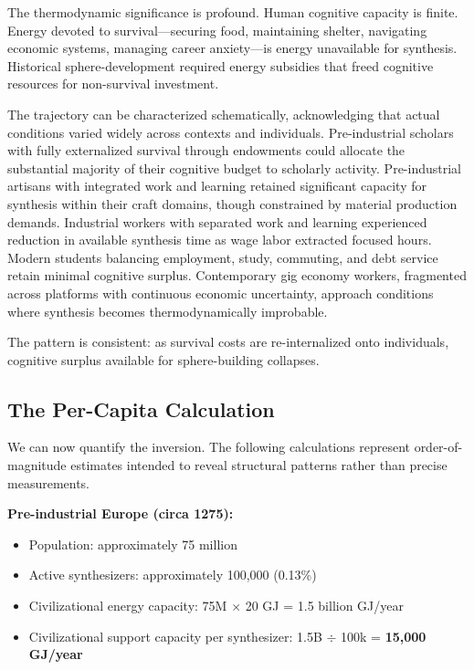 The thermodynamic significance is profound. Human cognitive capacity is finite. Energy devoted to survival---securing food, maintaining shelter, navigating economic systems, managing career anxiety---is energy unavailable for synthesis. Historical sphere-development required energy subsidies that freed cognitive resources for non-survival investment.

The trajectory can be characterized schematically, acknowledging that actual conditions varied widely across contexts and individuals. Pre-industrial scholars with fully externalized survival through endowments could allocate the substantial majority of their cognitive budget to scholarly activity. Pre-industrial artisans with integrated work and learning retained significant capacity for synthesis within their craft domains, though constrained by material production demands. Industrial workers with separated work and learning experienced reduction in available synthesis time as wage labor extracted focused hours. Modern students balancing employment, study, commuting, and debt service retain minimal cognitive surplus. Contemporary gig economy workers, fragmented across platforms with continuous economic uncertainty, approach conditions where synthesis becomes thermodynamically improbable.

The pattern is consistent: as survival costs are re-internalized onto individuals, cognitive surplus available for sphere-building collapses.

\subsection{The Per-Capita Calculation}

We can now quantify the inversion. The following calculations represent order-of-magnitude estimates intended to reveal structural patterns rather than precise measurements.

\textbf{Pre-industrial Europe (circa 1275):}

\begin{itemize}
    \item Population: approximately 75 million
    \item Active synthesizers: approximately 100,000 (0.13\%)
    \item Civilizational energy capacity: 75M $\times$ 20 GJ = 1.5 billion GJ/year
    \item Civilizational support capacity per synthesizer: 1.5B $\div$ 100k = \textbf{15,000 GJ/year}
\end{itemize}

